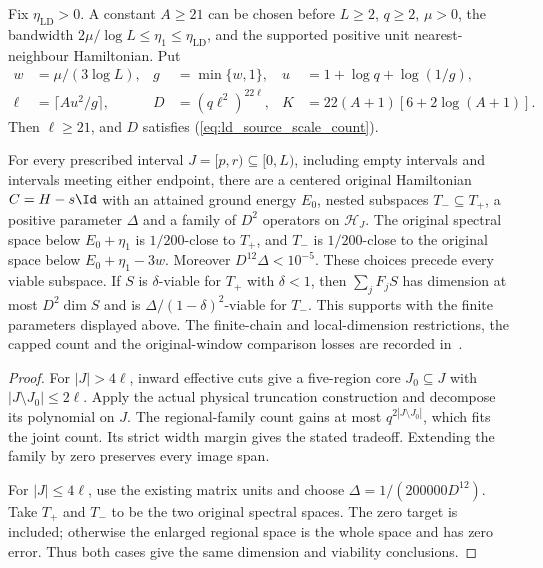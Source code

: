 \begin{theorem}
    \label{thm:physical_low_energy_interval_family}
    \leanok
    Fix $\eta_{\mathrm{LD}}>0$. A constant $A\ge21$ can be chosen before
    $L\ge2$, $q\ge2$, $\mu>0$, the bandwidth
    $2\mu/\log L\le\eta_1\le\eta_{\mathrm{LD}}$, and the supported
    positive unit nearest-neighbour Hamiltonian. Put
    \begin{align*}
        w    & =\mu/(3\log L),         & g & =\min\{w,1\},        &
        u    & =1+\log q+\log(1/g),                                 \\
        \ell & =\lceil Au^2/g\rceil,   & D & =(q\ell^2)^{22\ell}, &
        K    & =22(A+1)[6+2\log(A+1)].
    \end{align*}
    Then $\ell\ge21$, and $D$ satisfies
    (\ref{eq:ld_source_scale_count}).

    For every prescribed interval $J=[p,r)\subseteq[0,L)$, including
    empty intervals and intervals meeting either endpoint, there are a
    centered original Hamiltonian $C=H-s\Id$ with an attained ground
    energy $E_0$, nested subspaces $T_-\subseteq T_+$, a positive
    parameter $\Delta$ and a family of $D^2$ operators on $\mathcal H_J$.
    The original spectral space below $E_0+\eta_1$ is $1/200$-close to
    $T_+$, and $T_-$ is $1/200$-close to the original space below
    $E_0+\eta_1-3w$. Moreover $D^{12}\Delta<10^{-5}$.
    These choices precede every viable subspace. If $S$ is
    $\delta$-viable for $T_+$ with $\delta<1$, then $\sum_jF_jS$ has
    dimension at most $D^2\dim S$ and is
    $\Delta/(1-\delta)^2$-viable for $T_-$.
    This supports \cite[Theorem~4.8]{Arad2016RigorousRG} with the finite
    parameters displayed above. The finite-chain and local-dimension
    restrictions, the capped count and the original-window comparison losses
    are recorded in~\cite{gap:alvv16_low_energy_family_buffers}.
\end{theorem}
\begin{proof}
    \leanok
    For $|J|>4\ell$, inward effective cuts give a five-region core
    $J_0\subseteq J$ with $|J\setminus J_0|\le2\ell$. Apply the actual
    physical truncation construction and decompose its polynomial on $J$.
    The regional-family count gains at most $q^{2|J\setminus J_0|}$,
    which fits the joint count. Its strict width margin gives the stated
    tradeoff. Extending the family by zero preserves every image span.

    For $|J|\le4\ell$, use the existing matrix units and choose
    $\Delta=1/(200000D^{12})$. Take $T_+$ and $T_-$ to be the two
    original spectral spaces. The zero target is included; otherwise
    the enlarged regional space is the whole space and has zero error.
    Thus both cases give the same dimension and viability conclusions.
\end{proof}

